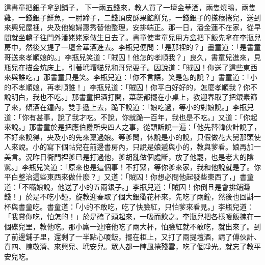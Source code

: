 這書童把銀子拿到鋪子，𨮸下一兩五錢來，教人買了一壇金華酒，兩隻燒鴨，兩隻雞，一錢銀子鮮魚，一肘蹄子，二錢頂皮酥果餡餅兒，一錢銀子的搽穰捲兒，送到來興兒屋裡，央及他媳婦惠秀替他整理，安排端正。那一日，潘金蓮不在家，從早間就坐轎子往門外潘姥姥家做生日去了。書童使畫童兒用方盒把下飯先拿在李瓶兒房中，然後又提了一壇金華酒進去。李瓶兒便問：「是那裡的？」畫童道：「是書童哥送來孝順娘的。」李瓶兒笑道：「賊囚！他怎的孝順我？」良久，書童兒進來，見瓶兒在描金炕床上，引著玳瑁貓兒和哥兒耍子。因說道：「賊囚！你送了這些東西來與誰吃，」那書童只是笑。李瓶兒道：「你不言語，笑是怎的說？」書童道：「小的不孝順娘，再孝順誰！」李瓶兒道：「賊囚！你平白好好的，怎麼孝順我？你不說明白，我也不吃。」那書童把酒打開，菜蔬都擺在小桌上，教迎春取了把銀素篩了來，傾酒在鐘內，雙手遞上去，跪下說道：「娘吃過，等小的對娘說。」李瓶兒道：「你有甚事，說了我才吃。不說，你就跪一百年，我也是不吃。」又道：「你起來說。」那書童於是把應伯爵所央四人之事，從頭訴說一遍：「他先替韓伙計說了，不好來說得，央及小的先來稟過娘。等爹問，休說是小的說，只假做花大舅那頭使人來說。小的寫下個帖兒在前邊書房內，只說是娘遞與小的，教與爹看。娘再加一美言。況昨日衙門裡爹已是打過他，爹胡亂做個處斷，放了他罷，也是老大的陰騭。」李瓶兒笑道：「原來也是這個事！不打緊，等你爹來家，我和他說就是了。你平白整治這些東西來做什麼？」又道：「賊囚！你想必問他起發些東西了，」書童道：「不瞞娘說，他送了小的五兩銀子。」李瓶兒道：「賊囚！你倒且是會排鋪賺錢！」於是不吃小鐘，旋教迎春取了個大銀衢花杯來，先吃了兩鐘，然後也回斟一杯與書童吃。書童道：「小的不敢吃，吃了快臉紅，只怕爹來看見。」李瓶兒道：「我賞你吃，怕怎的！」於是磕了頭起來，一吸而飲之。李瓶兒把各樣嗄飯揀在一個碟兒里，教他吃。那小廝一連陪他吃了兩大杯，怕臉紅就不敢吃，就出來了。到了前邊鋪子里，還剩了一半點心嗄飯，擺在柜上，又打了兩提壇酒，請了傅伙計、賁四、陳敬濟、來興兒、玳安兒。眾人都一陣風捲殘雲，吃了個凈光。就忘了教平安兒吃。

